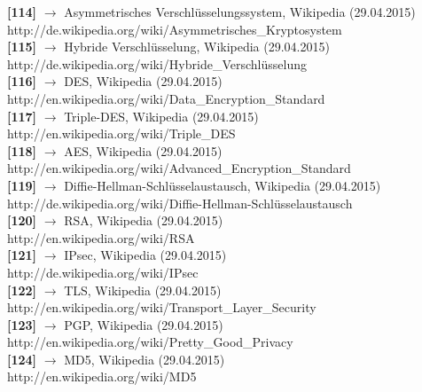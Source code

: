 \documentclass[12pt,a4paper]{report}
\begin{document}
\begin{onehalfspace}
\noindent
\textbf{[114]} $\rightarrow$ Asymmetrisches Verschlüsselungssystem, Wikipedia (29.04.2015)\\
http://de.wikipedia.org/wiki/Asymmetrisches\_Kryptosystem\\

\noindent
\textbf{[115]} $\rightarrow$ Hybride Verschlüsselung, Wikipedia (29.04.2015)\\
http://de.wikipedia.org/wiki/Hybride\_Verschlüsselung\\

\noindent
\textbf{[116]} $\rightarrow$ DES, Wikipedia (29.04.2015)\\
http://en.wikipedia.org/wiki/Data\_Encryption\_Standard\\

\noindent
\textbf{[117]} $\rightarrow$ Triple-DES, Wikipedia (29.04.2015)\\
http://en.wikipedia.org/wiki/Triple\_DES\\

\noindent
\textbf{[118]} $\rightarrow$ AES, Wikipedia (29.04.2015)\\
http://en.wikipedia.org/wiki/Advanced\_Encryption\_Standard\\

\noindent
\textbf{[119]} $\rightarrow$ Diffie-Hellman-Schlüsselaustausch, Wikipedia (29.04.2015)\\
http://de.wikipedia.org/wiki/Diffie-Hellman-Schlüsselaustausch\\

\noindent
\textbf{[120]} $\rightarrow$ RSA, Wikipedia (29.04.2015)\\
http://en.wikipedia.org/wiki/RSA\\

\noindent
\textbf{[121]} $\rightarrow$ IPsec, Wikipedia (29.04.2015)\\
http://de.wikipedia.org/wiki/IPsec\\

\noindent
\textbf{[122]} $\rightarrow$ TLS, Wikipedia (29.04.2015)\\
http://en.wikipedia.org/wiki/Transport\_Layer\_Security\\

\noindent
\textbf{[123]} $\rightarrow$ PGP, Wikipedia (29.04.2015)\\
http://en.wikipedia.org/wiki/Pretty\_Good\_Privacy\\

\noindent
\textbf{[124]} $\rightarrow$ MD5, Wikipedia (29.04.2015)\\
http://en.wikipedia.org/wiki/MD5\\


\end{onehalfspace}
\end{document}
